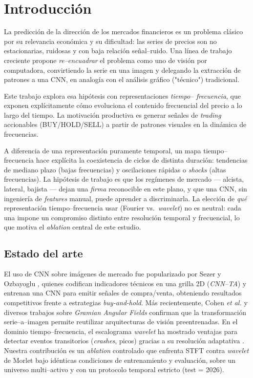 \documentclass[conference]{IEEEtran}
\begin{document}
\section{Introducción}

La predicción de la dirección de los mercados financieros es un problema
clásico por su relevancia económica y su dificultad: las series de precios
son no estacionarias, ruidosas y con baja relación señal--ruido. Una línea
de trabajo creciente propone \emph{re--encuadrar} el problema como uno de
visión por computadora, convirtiendo la serie en una imagen y delegando la
extracción de patrones a una CNN, en analogía con el análisis gráfico
("técnico") tradicional.

Este trabajo explora esa hipótesis con representaciones \emph{tiempo--
frecuencia}, que exponen explícitamente cómo evoluciona el contenido
frecuencial del precio a lo largo del tiempo. La motivación productiva es
generar señales de \emph{trading} accionables (BUY/HOLD/SELL) a partir de
patrones visuales en la dinámica de frecuencias.

A diferencia de una representación puramente temporal, un mapa
tiempo--frecuencia hace explícita la coexistencia de ciclos de distinta
duración: tendencias de mediano plazo (bajas frecuencias) y oscilaciones
rápidas o \emph{shocks} (altas frecuencias). La hipótesis de trabajo es que
los regímenes de mercado --- alcista, lateral, bajista --- dejan una
\emph{firma} reconocible en este plano, y que una CNN, sin ingeniería de
\emph{features} manual, puede aprender a discriminarla. La elección de
\emph{qué} representación tiempo--frecuencia usar (Fourier vs.\ \emph{wavelet})
no es neutral: cada una impone un compromiso distinto entre resolución
temporal y frecuencial, lo que motiva el \emph{ablation} central de este
estudio.

\subsection{Estado del arte}

El uso de CNN sobre imágenes de mercado fue popularizado por Sezer y Ozbayoglu
\cite{sezer2018}, quienes codifican indicadores técnicos en una grilla 2D
(\emph{CNN--TA}) y entrenan una CNN para emitir señales de compra/venta,
obteniendo resultados competitivos frente a estrategias \emph{buy-and-hold}.
Más recientemente, Cohen \emph{et al.} \cite{cohen2020} y diversos trabajos
sobre \emph{Gramian Angular Fields} \cite{wang2015} confirman que la
transformación serie--a--imagen permite reutilizar arquitecturas de visión
preentrenadas. En el dominio tiempo--frecuencia, el escalograma
\emph{wavelet} ha mostrado ventajas para detectar eventos transitorios
(\emph{crashes}, picos) gracias a su resolución adaptativa
\cite{torrence1998}. Nuestra contribución es un \emph{ablation} controlado
que enfrenta STFT contra \emph{wavelet} de Morlet bajo idénticas condiciones
de entrenamiento y evaluación, sobre un universo multi--activo y con un
protocolo temporal estricto (test = 2026).
\end{document}
